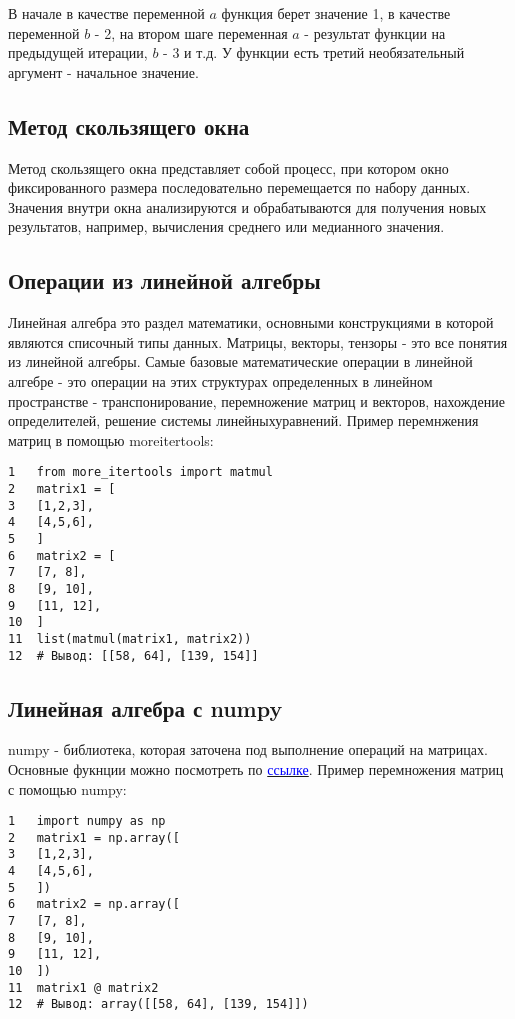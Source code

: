 \documentclass[12pt, a4paper]{article}
\begin{document}
В начале в качестве переменной $a$ функция берет значение 1,
в качестве переменной $b$ - 2, на втором шаге переменная $a$ - 
результат функции на предыдущей итерации, $b$ - 3 и т.д. У
функции есть третий необязательный аргумент - начальное значение.

\subsection{Метод скользящего окна}

Метод скользящего окна представляет собой процесс, при котором 
окно фиксированного размера последовательно перемещается по 
набору данных. Значения внутри окна анализируются и 
обрабатываются для получения новых результатов, например, 
вычисления среднего или медианного значения.

\subsection{Операции из линейной алгебры}

Линейная алгебра это раздел математики, основными конструкциями
в которой являются списочный типы данных. Матрицы, векторы, 
тензоры - это все понятия из линейной алгебры.
Самые базовые математические операции в линейной алгебре - это 
операции на этих структурах определенных в линейном 
пространстве - транспонирование, перемножение матриц и 
векторов, нахождение определителей, решение системы 
линейныхуравнений. Пример перемнжения матриц в помощью
more\textunderscore itertools:

\begin{verbatim}
1   from more_itertools import matmul
2   matrix1 = [
3   [1,2,3],
4   [4,5,6],
5   ]
6   matrix2 = [
7   [7, 8],
8   [9, 10],
9   [11, 12],
10  ]
11  list(matmul(matrix1, matrix2))
12  # Вывод: [[58, 64], [139, 154]]
\end{verbatim}

\newpage

\subsection{Линейная алгебра с numpy}

numpy - библиотека, которая заточена под выполнение 
операций на матрицах. Основные фукнции можно посмотреть по 
\href{https://github.com/KeithGalli/NumPy/blob/master/
NumPy%
Пример перемножения матриц с помощью numpy:

\begin{verbatim}
1   import numpy as np
2   matrix1 = np.array([
3   [1,2,3],
4   [4,5,6],
5   ])
6   matrix2 = np.array([
7   [7, 8],
8   [9, 10],
9   [11, 12],
10  ])
11  matrix1 @ matrix2
12  # Вывод: array([[58, 64], [139, 154]])
\end{verbatim}
\end{document}
